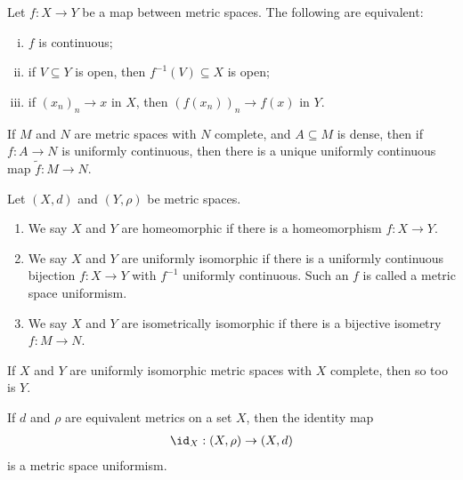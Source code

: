 \begin{fact}
  Let $f\colon X\rightarrow Y$ be a map between metric spaces. The following are equivalent:
  \begin{enumerate}[(i)]
    \item $f$ is continuous;
    \item if $V\subseteq Y$ is open, then $f^{-1}\left(V\right)\subseteq X$ is open;
    \item if $\left(x_n\right)_n\rightarrow x$ in $X$, then $\left(f\left(x_n\right)\right)_n\rightarrow f(x)$ in $Y$.
  \end{enumerate}
\end{fact}
\begin{fact}
  If $M$ and $N$ are metric spaces with $N$ complete, and $A\subseteq M$ is dense, then if $f\colon A\rightarrow N$ is uniformly continuous, then there is a unique uniformly continuous map $\tilde{f}\colon M\rightarrow N$.
\end{fact}
\begin{definition}
  Let $\left(X,d\right)$ and $\left(Y,\rho\right)$ be metric spaces.
  \begin{enumerate}[(1)]
    \item We say $X$ and $Y$ are homeomorphic if there is a homeomorphism $f\colon X\rightarrow Y$.
    \item We say $X$ and $Y$ are uniformly isomorphic if there is a uniformly continuous bijection $f\colon X\rightarrow Y$ with $f^{-1}$ uniformly continuous. Such an $f$ is called a metric space uniformism.
    \item We say $X$ and $Y$ are isometrically isomorphic if there is a bijective isometry $f\colon M\rightarrow N$.
  \end{enumerate}
\end{definition}
\begin{fact}
  If $X$ and $Y$ are uniformly isomorphic metric spaces with $X$ complete, then so too is $Y$.\newline

  If $d$ and $\rho$ are equivalent metrics on a set $X$, then the identity map
  \begin{align*}
    \id_{X}:\left(X,\rho\right)\rightarrow \left(X,d\right)
  \end{align*}
  is a metric space uniformism.
\end{fact}
